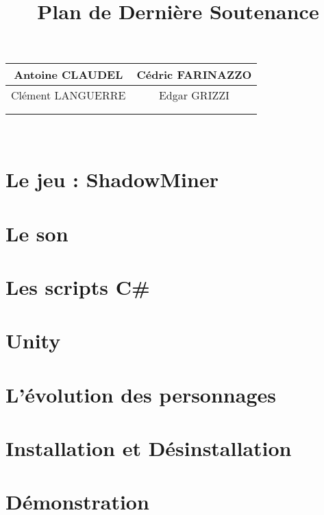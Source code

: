 \documentclass[A4paper,11pt]{article}
\title{\begin{Huge}Plan de Dernière Soutenance\end{Huge}}
\begin{document}
\date{}

\maketitle
\begin{center}

\begin{tabular}{|c|c|}
\hline Antoine CLAUDEL & Cédric FARINAZZO \\
\hline Clément LANGUERRE & Edgar GRIZZI \\
\hline
\multicolumn{2}{c}{} \\
\multicolumn{2}{c}{} \\
\end{tabular}\\
\end{center}
\section{Le jeu : ShadowMiner}
\section{Le son}
\section{Les scripts C\#}
\section{Unity}
\section{L'évolution des personnages}
\section{Installation et Désinstallation}
\section{Démonstration}
\end{document}
